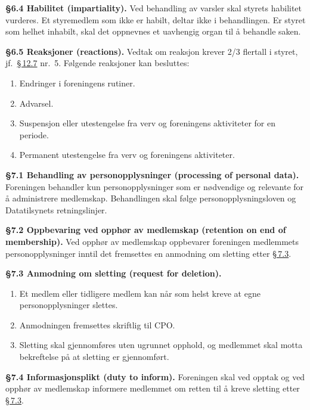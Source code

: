 \documentclass{../../../Common/Latex/Templates/rapport}
\begin{document}
\textbf{\S 6.4 Habilitet (impartiality).}\label{nbylaw:6.4} Ved behandling av varsler skal styrets habilitet vurderes. Et styremedlem som ikke er habilt, deltar ikke i behandlingen. Er styret som helhet inhabilt, skal det oppnevnes et uavhengig organ til \r{a} behandle saken.

\textbf{\S 6.5 Reaksjoner (reactions).}\label{nbylaw:6.5} Vedtak om reaksjon krever 2/3 flertall i styret, jf.\ \hyperref[nbylaw:12.7]{\S\,12.7} nr.\ 5. Følgende reaksjoner kan besluttes:
\begin{enumerate}
  \item Endringer i foreningens rutiner.
  \item Advarsel.
  \item Suspensjon eller utestengelse fra verv og foreningens aktiviteter for en periode.
  \item Permanent utestengelse fra verv og foreningens aktiviteter.
\end{enumerate}

\label{nbylaw:7}
\textbf{\S 7.1 Behandling av personopplysninger (processing of personal data).}\label{nbylaw:7.1} Foreningen behandler kun personopplysninger som er nødvendige og relevante for \r{a} administrere medlemskap. Behandlingen skal følge personopplysningsloven og Datatilsynets retningslinjer.

\textbf{\S 7.2 Oppbevaring ved opphør av medlemskap (retention on end of membership).}\label{nbylaw:7.2} Ved opphør av medlemskap oppbevarer foreningen medlemmets personopplysninger inntil det fremsettes en anmodning om sletting etter \hyperref[nbylaw:7.3]{\S\,7.3}.

\textbf{\S 7.3 Anmodning om sletting (request for deletion).}\label{nbylaw:7.3}
\begin{enumerate}
  \item Et medlem eller tidligere medlem kan n\r{a}r som helst kreve at egne personopplysninger slettes.
  \item Anmodningen fremsettes skriftlig til CPO.
  \item Sletting skal gjennomføres uten ugrunnet opphold, og medlemmet skal motta bekreftelse p\r{a} at sletting er gjennomført.
\end{enumerate}

\textbf{\S 7.4 Informasjonsplikt (duty to inform).}\label{nbylaw:7.4} Foreningen skal ved opptak og ved opphør av medlemskap informere medlemmet om retten til \r{a} kreve sletting etter \hyperref[nbylaw:7.3]{\S\,7.3}.
\end{document}
